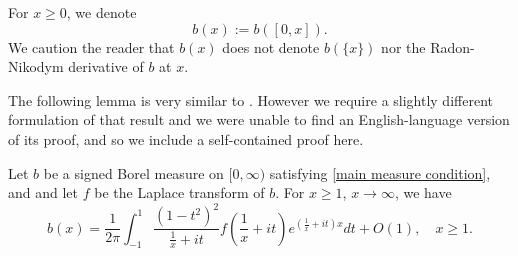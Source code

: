     For $x \geq 0$, we denote
    \begin{equation*}
        b(x) := b([0,x]).
    \end{equation*}
    We caution the reader that $b(x)$ does not denote $b(\{x\})$ nor the Radon-Nikodym derivative of $b$ at $x$.
    
    The following lemma is very similar to \cite[Lemma 2.1.3]{subhankulov}. However we require a slightly different formulation of that result and we were unable to find an English-language
    version of its proof, and so we include a self-contained proof here.
    \begin{lem}\label{subhankulov key estimate} 
        Let $b$ be a signed Borel measure on $[0,\infty)$ satisfying \eqref{main measure condition}, and and let $f$ be the Laplace transform of $b.$
        For $x\geq 1$, $x \to\infty$, we have
        \begin{equation*}
            b(x) = \frac1{2\pi}\int_{-1}^1\frac{(1-t^2)^2}{\frac1x+it}f(\frac1x+it)e^{(\frac1x+it)x}dt+O(1),\quad x\geq1.
        \end{equation*}
    \end{lem}
